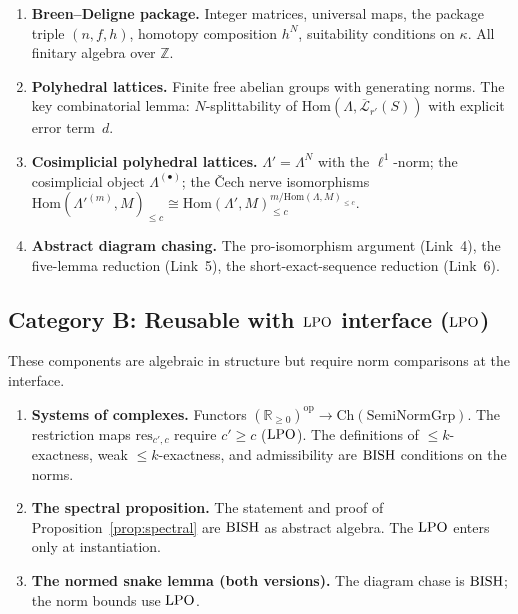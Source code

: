 \documentclass[11pt,a4paper]{article}
\theoremstyle{plain}
\theoremstyle{definition}
\newcommand{\BISH}{\textup{BISH}}
\newcommand{\LPO}{\textup{LPO}}
\newcommand{\R}{\mathbb{R}}
\newcommand{\Z}{\mathbb{Z}}
\begin{document}
\begin{enumerate}[nosep]
\item \textbf{Breen--Deligne package.}  Integer matrices, universal
  maps, the package triple $(n, f, h)$, homotopy composition
  $h^N$, suitability conditions on $\kappa$.  All finitary
  algebra over $\Z$.

\item \textbf{Polyhedral lattices.}  Finite free abelian groups with
  generating norms.  The key combinatorial lemma:
  $N$-splittability of $\mathrm{Hom}(\Lambda,
  \overline{\mathcal{L}}_{r'}(S))$ with explicit error term~$d$.

\item \textbf{Cosimplicial polyhedral lattices.}
  $\Lambda' = \Lambda^N$ with the $\ell^1$-norm; the cosimplicial
  object $\Lambda^{(\bullet)}$; the Čech nerve isomorphisms
  $\mathrm{Hom}(\Lambda'^{(m)}, M)_{\leq c} \cong
  \mathrm{Hom}(\Lambda', M)_{\leq c}^{m /
  \mathrm{Hom}(\Lambda, M)_{\leq c}}$.

\item \textbf{Abstract diagram chasing.}  The pro-isomorphism
  argument (Link~4), the five-lemma reduction (Link~5), the
  short-exact-sequence reduction (Link~6).
\end{enumerate}

\subsection{Category B: Reusable with $\LPO$ interface ($\LPO$)}

These components are algebraic in structure but require norm
comparisons at the interface.

\begin{enumerate}[nosep]
\item \textbf{Systems of complexes.}  Functors
  $(\R_{\geq 0})^{\mathrm{op}} \to \mathrm{Ch}(\mathrm{SemiNormGrp})$.
  The restriction maps $\mathrm{res}_{c',c}$ require
  $c' \geq c$ ($\LPO$).  The definitions of $\leq k$-exactness,
  weak $\leq k$-exactness, and admissibility are $\BISH$
  conditions on the norms.

\item \textbf{The spectral proposition.}
  The statement and proof of Proposition~\ref{prop:spectral}
  are $\BISH$ as abstract algebra.  The $\LPO$ enters only at
  instantiation.

\item \textbf{The normed snake lemma (both versions).}
  The diagram chase is $\BISH$; the norm bounds use
  $\LPO$.
\end{enumerate}
\end{document}
